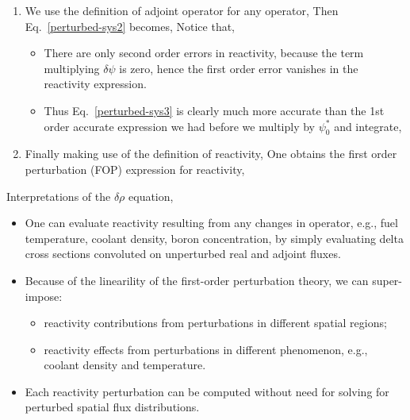 \documentclass{school-22.211-notes}
\begin{document}
\begin{enumerate}
\item We use the definition of adjoint operator for any operator, 
Then Eq.~\ref{perturbed-sys2} becomes, 
Notice that, 
\begin{itemize}
 \item There are only second order errors in reactivity, because the term multiplying $\delta \psi$ is zero, hence the first order error vanishes in the reactivity expression. 
 \item Thus Eq.~\ref{perturbed-sys3} is clearly much more accurate than the 1st order accurate expression we had before we multiply by $\psi_0^*$ and integrate,
\end{itemize}

 \item Finally making use of the definition of reactivity, 
   One obtains the first order perturbation (FOP) expression for reactivity, 
\end{enumerate}
Interpretations of the $\delta \rho$ equation, 
\begin{itemize}
\item One can evaluate reactivity resulting from any changes in operator, e.g., fuel temperature, coolant density, boron concentration, by simply evaluating delta cross sections convoluted on unperturbed real and adjoint fluxes. 

\item Because of the linearility of the first-order perturbation theory, we can super-impose: 
  \begin{itemize}
  \item reactivity contributions from perturbations in different spatial regions;
  \item reactivity effects from perturbations in different phenomenon, e.g., coolant density and temperature. 
  \end{itemize}

\item Each reactivity perturbation can be computed without need for solving for perturbed spatial flux distributions. 
\end{itemize}
\end{document}

